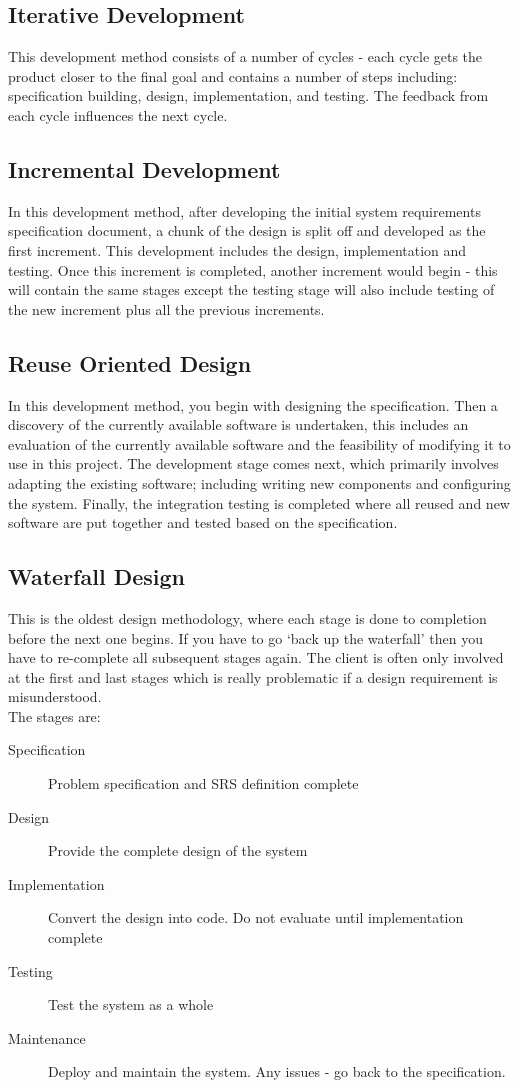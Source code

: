 \subsection{Iterative Development}
This development method consists of a number of cycles - each cycle gets the product closer to the final goal and contains a number of steps including: specification building, design, implementation, and testing. The feedback from each cycle influences the next cycle.

\subsection{Incremental Development}
In this development method, after developing the initial system requirements specification document, a chunk of the design is split off and developed as the first increment. This development includes the design, implementation and testing. Once this increment is completed, another increment would begin - this will contain the same stages except the testing stage will also include testing of the new increment plus all the previous increments.

\subsection{Reuse Oriented Design}
In this development method, you begin with designing the specification. Then a discovery of the currently available software is undertaken, this includes an evaluation of the currently available software and the feasibility of modifying it to use in this project. The development stage comes next, which primarily involves adapting the existing software; including writing new components and configuring the system. Finally, the integration testing is completed where all reused and new software are put together and tested based on the specification.

\subsection{Waterfall Design}
This is the oldest design methodology, where each stage is done to completion before the next one begins. If you have to go `back up the waterfall' then you have to re-complete all subsequent stages again. The client is often only involved at the first and last stages which is really problematic if a design requirement is misunderstood.\\

The stages are:
\begin{description}
    \item[Specification] Problem specification and SRS definition complete
    \item[Design] Provide the complete design of the system
    \item[Implementation] Convert the design into code. Do not evaluate until implementation complete
    \item[Testing] Test the system as a whole
    \item[Maintenance] Deploy and maintain the system. Any issues - go back to the specification.
\end{description}